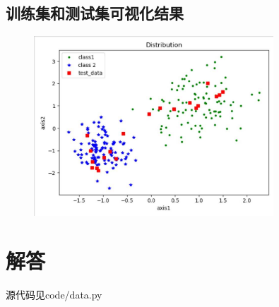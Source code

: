 \documentclass{article}
\begin{document}
\subsection*{训练集和测试集可视化结果} %
\label{sub:训练集和测试集可视化结果}
	\begin{figure}[H]
		\centering
		\includegraphics[width=0.8\textwidth]{Img/example.jpg}
	\end{figure}
\clearpage
\section*{解答} %
\label{sec:解答}
源代码见code/data.py
\end{document}
